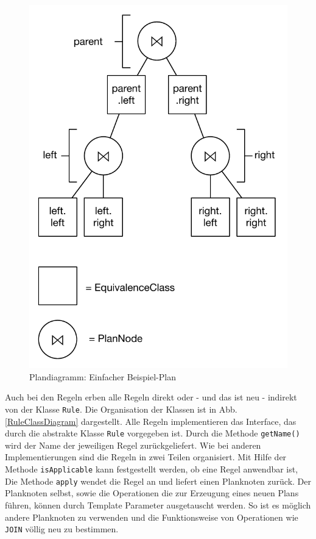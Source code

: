 \begin{figure}[ht]
  \centering
  \includegraphics{04_Implementierung/00_media/Plan.pdf}
  \caption{Plandiagramm: Einfacher Beispiel-Plan}
  \label{SimplePlan}
\end{figure}


Auch bei den Regeln erben alle Regeln direkt oder - und das ist neu - indirekt von der Klasse \texttt{Rule}. Die Organisation der Klassen ist in Abb. \ref{RuleClassDiagram} dargestellt. Alle Regeln implementieren das Interface, das durch die abstrakte Klasse \texttt{Rule} vorgegeben ist. Durch die Methode \texttt{getName()} wird der Name der jeweiligen Regel zurückgeliefert. Wie bei anderen Implementierungen sind die Regeln in zwei Teilen organisiert. Mit Hilfe der Methode \texttt{isApplicable} kann festgestellt werden, ob eine Regel anwendbar ist, Die Methode \texttt{apply} wendet die Regel an und liefert einen Planknoten zurück. Der Planknoten selbst, sowie die Operationen die zur Erzeugung eines neuen Plans führen, können durch Template Parameter ausgetauscht werden. So ist es möglich andere Planknoten zu verwenden und die Funktionsweise von Operationen wie \texttt{JOIN} völlig neu zu bestimmen.


